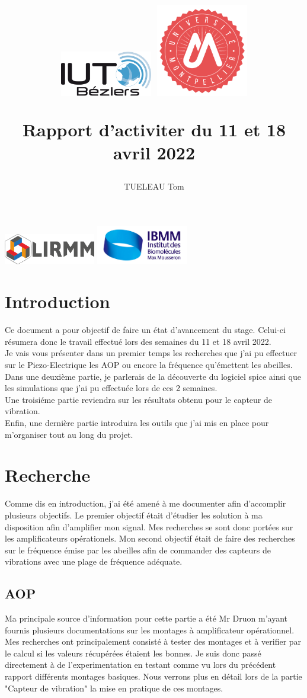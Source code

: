 \documentclass[11pt,french,a4paper]{article}
\title{
 \centering
         \includegraphics[width=4cm]{../../../logo/IUTlogo.png}  \hspace{7cm}
         \includegraphics[width=4cm]{../../../logo/UMlogo.png}  \hspace{7cm}
    
	\LARGE{Rapport d'activiter du 11 et 18 avril 2022}
	\author{TUELEAU Tom}
}
\author{
	\date{}
}
\begin{document}
\maketitle
	 \includegraphics[width=4cm]{../../../logo/LIRMMlogo.png}  \hspace{7cm}
         \includegraphics[width=4cm]{../../../logo/IBMMlogo.jpg}  \hspace{7cm}
\newpage
\tableofcontents
\newpage
\section{Introduction}
Ce document a pour objectif de faire un état d'avancement du stage. Celui-ci résumera donc le travail effectué lors des semaines du 11 et 18 avril 2022.
\\Je vais vous présenter dans un premier temps les recherches que j'ai pu effectuer sur le Piezo-Electrique les AOP ou encore la fréquence qu'émettent les abeilles. 
\\Dans une deuxième partie, je parlerais de la découverte du logiciel spice ainsi que les simulations que j'ai pu effectuée lors de ces 2 semaines.
\\Une troisiéme partie reviendra sur les résultats obtenu pour le capteur de vibration. 
\\Enfin, une dernière partie introduira les outils que j'ai mis en place pour m'organiser tout au long du projet. 

\newpage
\section{Recherche}
Comme dis en introduction, j'ai été amené à me documenter afin d'accomplir plusieurs objectifs. Le premier objectif était d'étudier les solution à ma disposition afin d'amplifier mon signal. Mes recherches se sont donc portées sur les amplificateurs opérationels. Mon second objectif était de faire des recherches sur le fréquence émise par les abeilles afin de commander des capteurs de vibrations avec une plage de fréquence adéquate. 
\subsection{AOP}
Ma principale source d'information pour cette partie a été Mr Druon m'ayant fournis plusieurs documentations sur les montages à amplificateur opérationnel. 
Mes recherches ont principalement consisté à tester des montages et à verifier par le calcul si les valeurs récupérées étaient les bonnes.
Je suis donc passé directement à de l'experimentation en testant comme vu lors du précédent rapport différents montages basiques.
Nous verrons plus en détail lors de la partie "Capteur de vibration" la mise en pratique de ces montages.
\end{document}

